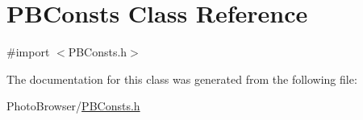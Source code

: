 \hypertarget{interface_p_b_consts}{
\section{PBConsts Class Reference}
\label{interface_p_b_consts}
}


{\ttfamily \#import $<$PBConsts.h$>$}



The documentation for this class was generated from the following file:\begin{DoxyCompactItemize}
\item 
PhotoBrowser/\hyperlink{_p_b_consts_8h}{PBConsts.h}\end{DoxyCompactItemize}
